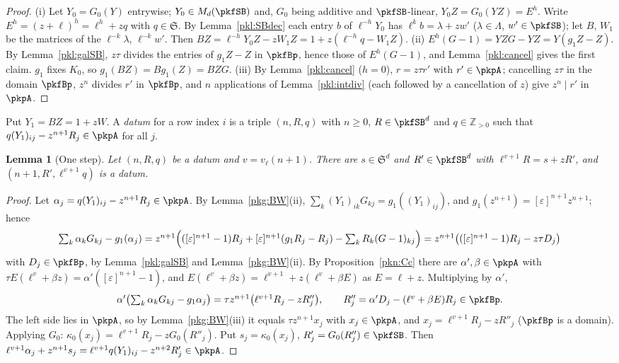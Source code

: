 \documentclass[10pt]{amsart}
\newtheorem{lemma}[theorem]{Lemma}
\theoremstyle{definition}
\theoremstyle{remark}
\newcommand{\Z}{\mathbb Z}
\begin{document}
\begin{proof}
(i) Let $Y_0=G_0(Y)$ entrywise; $Y_0\in M_d(\pkfSB)$ and, $G_0$ being additive and $\pkfSB$-linear,
$Y_0Z=G_0(YZ)=E^h$. Write $E^h=(z+\ell)^h=\ell^h+zq$ with $q\in\mathfrak S$. By Lemma~\ref{pkl:SBdec} each
entry $b$ of $\ell^{-h}Y_0$ has $\ell^kb=\lambda+zw'$ ($\lambda\in\Lambda$, $w'\in\pkfSB$); let $B$, $W_1$ be the
matrices of the $\ell^{-k}\lambda$, $\ell^{-k}w'$. Then $BZ=\ell^{-h}Y_0Z-zW_1Z=1+z(\ell^{-h}q-W_1Z)$.
(ii) $E^h(G-1)=YZG-YZ=Y(g_1Z-Z)$. By Lemma~\ref{pkl:galSB}, $z\tau$ divides the entries of $g_1Z-Z$ in
$\pkfBp$, hence those of $E^h(G-1)$, and Lemma~\ref{pkl:cancel} gives the first claim. $g_1$ fixes $K_0$, so
$g_1(BZ)=Bg_1(Z)=BZG$.
(iii) By Lemma~\ref{pkl:cancel} ($h=0$), $r=z\tau r'$ with $r'\in\pkpA$; cancelling $z\tau$ in the domain
$\pkfBp$, $z^n$ divides $r'$ in $\pkfBp$, and $n$ applications of Lemma~\ref{pkl:intdiv} (each followed by a
cancellation of $z$) give $z^n\mid r'$ in $\pkpA$.
\end{proof}

Put $Y_1=BZ=1+zW$. A \emph{datum} for a row index $i$ is a triple $(n,R,q)$ with $n\ge0$, $R\in\pkfSB^d$ and
$q\in\Z_{>0}$ such that $q(Y_1)_{ij}-z^{n+1}R_j\in\pkpA$ for all $j$.

\begin{lemma}[One step]\label{pkg:step}
Let $(n,R,q)$ be a datum and $v=v_\ell(n+1)$. There are $s\in\mathfrak S^d$ and $R'\in\pkfSB^d$ with
$\ell^{v+1}R=s+zR'$, and $(n+1,R',\ell^{v+1}q)$ is a datum.
\end{lemma}

\begin{proof}
Let $\alpha_j=q(Y_1)_{ij}-z^{n+1}R_j\in\pkpA$. By Lemma~\ref{pkg:BW}(ii), $\sum_k(Y_1)_{ik}G_{kj}=
g_1((Y_1)_{ij})$, and $g_1(z^{n+1})=[\varepsilon]^{n+1}z^{n+1}$; hence
\[
\textstyle\sum_k\alpha_kG_{kj}-g_1(\alpha_j)=z^{n+1}\Bigl(([\varepsilon]^{n+1}-1)R_j+[\varepsilon]^{n+1}
(g_1R_j-R_j)-\sum_kR_k(G-1)_{kj}\Bigr)=z^{n+1}\bigl(([\varepsilon]^{n+1}-1)R_j-z\tau D_j\bigr)
\]
with $D_j\in\pkfBp$, by Lemma~\ref{pkl:galSB} and Lemma~\ref{pkg:BW}(ii). By Proposition~\ref{pkn:Cc} there are
$\alpha',\beta\in\pkpA$ with $\tau E(\ell^v+\beta z)=\alpha'([\varepsilon]^{n+1}-1)$, and
$E(\ell^v+\beta z)=\ell^{v+1}+z(\ell^v+\beta E)$ as $E=\ell+z$. Multiplying by $\alpha'$,
\[
\textstyle\alpha'\bigl(\sum_k\alpha_kG_{kj}-g_1\alpha_j\bigr)=\tau z^{n+1}\bigl(\ell^{v+1}R_j-zR''_j\bigr),\qquad
R''_j=\alpha'D_j-(\ell^v+\beta E)R_j\in\pkfBp .
\]
The left side lies in $\pkpA$, so by Lemma~\ref{pkg:BW}(iii) it equals $\tau z^{n+1}x_j$ with $x_j\in\pkpA$,
and $x_j=\ell^{v+1}R_j-zR''_j$ ($\pkfBp$ is a domain). Applying $G_0$:
$\kappa_0(x_j)=\ell^{v+1}R_j-zG_0(R''_j)$. Put $s_j=\kappa_0(x_j)$, $R'_j=G_0(R''_j)\in\pkfSB$. Then
$\ell^{v+1}\alpha_j+z^{n+1}s_j=\ell^{v+1}q(Y_1)_{ij}-z^{n+2}R'_j\in\pkpA$.
\end{proof}
\end{document}

